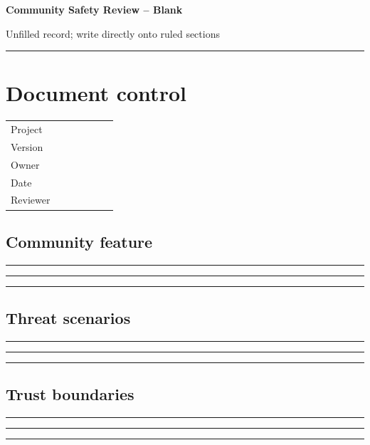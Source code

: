 \documentclass[11pt]{article}
\begin{document}
{\huge\bfseries\color{suiteblue} Community Safety Review -- Blank}\par
\vspace{0.15in}
{\normalsize\color{suitegray} Unfilled record; write directly onto ruled sections}\par
\vspace{0.15in}\hrule\vspace{0.15in}

\section{Document control}
\renewcommand{\arraystretch}{1.8}
\begin{tabularx}{\linewidth}{@{}p{0.30\linewidth}X@{}}\toprule
Project & \hrulefill\\ Version & \hrulefill\\ Owner & \hrulefill\\ Date & \hrulefill\\ Reviewer & \hrulefill\\ \bottomrule\end{tabularx}

\subsection{Community feature}
\noindent\rule{\linewidth}{0.3pt}\par\vspace{0.18in}
\noindent\rule{\linewidth}{0.3pt}\par\vspace{0.18in}
\noindent\rule{\linewidth}{0.3pt}\par\vspace{0.14in}

\subsection{Threat scenarios}
\noindent\rule{\linewidth}{0.3pt}\par\vspace{0.18in}
\noindent\rule{\linewidth}{0.3pt}\par\vspace{0.18in}
\noindent\rule{\linewidth}{0.3pt}\par\vspace{0.14in}

\subsection{Trust boundaries}
\noindent\rule{\linewidth}{0.3pt}\par\vspace{0.18in}
\noindent\rule{\linewidth}{0.3pt}\par\vspace{0.18in}
\noindent\rule{\linewidth}{0.3pt}\par\vspace{0.14in}
\end{document}
